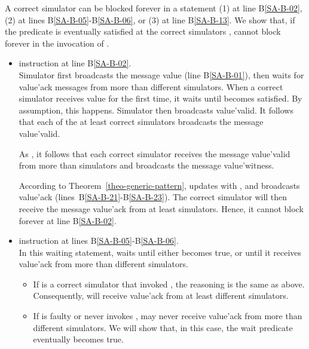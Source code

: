 \documentclass[11pt,letterpaper]{article}
\newlength {\afterproof}
\newenvironment{proofL}{\noindent{\bf Proof }}
{\hspace*{\fill}\par\vspace{\afterproof}}
\begin{document}
\begin{proofL}
A correct simulator  can be blocked forever in a  statement
(1) at line B\ref{SA-B-02},  (2) at lines B\ref{SA-B-05}-B\ref{SA-B-06}, or
(3) at line B\ref{SA-B-13}. We show that, if the predicate
  is eventually  satisfied at the correct simulators
,   cannot block forever in the invocation of .

\begin{itemize}
\vspace{-0.2cm}
\item  instruction at line B\ref{SA-B-02}. \\
Simulator  first broadcasts the message {\sc value}
(line B\ref{SA-B-01}), then waits for {\sc value'ack} messages from more than
 different simulators.
When a correct simulator  receives {\sc value} for the
first time, it waits until   becomes satisfied.
By assumption, this  happens.  Simulator   then broadcasts
{\sc value'valid}. It follows that each of the at least 
correct simulators  broadcasts the message {\sc value'valid}.

As  , it follows that each
correct simulator   receives the message {\sc value'valid}
from more than  simulators and broadcasts the message
{\sc value'witness}.

 According to Theorem~\ref{theo-generic-pattern},  updates 
 with  , and broadcasts {\sc value'ack}
(lines~B\ref{SA-B-21}-B\ref{SA-B-23}).
The correct simulator  will then receive the message
{\sc value'ack} from at least  
simulators. Hence, it cannot block forever at line  B\ref{SA-B-02}.

\vspace{-0.2cm}
\item  instruction at lines B\ref{SA-B-05}-B\ref{SA-B-06}.\\
In this waiting statement,  waits until
either  becomes true, or
until it receives {\sc value'ack} from more than 
different simulators.
\vspace{-0.3cm}
\begin{itemize}
\item
If  is a correct simulator that  invoked ,
the reasoning is the same as above. Consequently,  will receive
{\sc value'ack} from at least  different
simulators.
\vspace{-0.1cm}
\item
If  is faulty or never invokes ,  may never
receive {\sc value'ack} from more than  different
simulators. We will show that, in this case, the wait predicate
  eventually becomes true.
\end{itemize}


\end{itemize}
\end{proofL}
\end{document}
